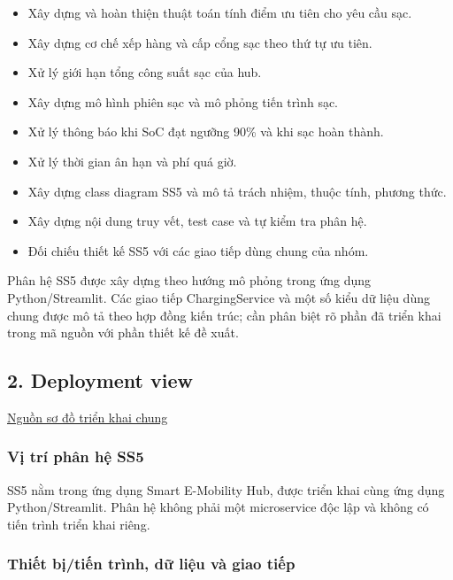 \documentclass[11pt,a4paper]{article}
\providecommand{\tightlist}{%
  \setlength{\itemsep}{0pt}\setlength{\parskip}{0pt}}
\begin{document}
\begin{itemize}
\tightlist
\item
  Xây dựng và hoàn thiện thuật toán tính điểm ưu tiên cho yêu cầu sạc.
\item
  Xây dựng cơ chế xếp hàng và cấp cổng sạc theo thứ tự ưu tiên.
\item
  Xử lý giới hạn tổng công suất sạc của hub.
\item
  Xây dựng mô hình phiên sạc và mô phỏng tiến trình sạc.
\item
  Xử lý thông báo khi SoC đạt ngưỡng 90\% và khi sạc hoàn thành.
\item
  Xử lý thời gian ân hạn và phí quá giờ.
\item
  Xây dựng class diagram SS5 và mô tả trách nhiệm, thuộc tính, phương
  thức.
\item
  Xây dựng nội dung truy vết, test case và tự kiểm tra phân hệ.
\item
  Đối chiếu thiết kế SS5 với các giao tiếp dùng chung của nhóm.
\end{itemize}

Phân hệ SS5 được xây dựng theo hướng mô phỏng trong ứng dụng
Python/Streamlit. Các giao tiếp ChargingService và một số kiểu dữ liệu
dùng chung được mô tả theo hợp đồng kiến trúc; cần phân biệt rõ phần đã
triển khai trong mã nguồn với phần thiết kế đề xuất.

\hypertarget{deployment-view}{%
\subsection{2. Deployment view}\label{deployment-view}}

\href{../../../diagrams/submission_3/shared/deployment.puml}{Nguồn sơ đồ
triển khai chung}

\hypertarget{vux1ecb-truxed-phuxe2n-hux1ec7-ss5}{%
\subsubsection{Vị trí phân hệ
SS5}\label{vux1ecb-truxed-phuxe2n-hux1ec7-ss5}}

SS5 nằm trong ứng dụng Smart E-Mobility Hub, được triển khai cùng ứng
dụng Python/Streamlit. Phân hệ không phải một microservice độc lập và
không có tiến trình triển khai riêng.

\hypertarget{thiux1ebft-bux1ecbtiux1ebfn-truxecnh-dux1eef-liux1ec7u-vuxe0-giao-tiux1ebfp}{%
\subsubsection{Thiết bị/tiến trình, dữ liệu và giao
tiếp}\label{thiux1ebft-bux1ecbtiux1ebfn-truxecnh-dux1eef-liux1ec7u-vuxe0-giao-tiux1ebfp}}
\end{document}
